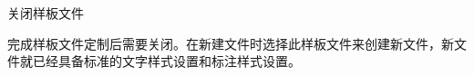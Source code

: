 \begin{procedure}
\begin{figure}[htbp]
\centering
\begin{floatrow}[2]
\end{floatrow}
\end{figure}

\item 关闭样板文件

完成样板文件定制后需要关闭。在新建文件时选择此样板文件来创建新文件，新文件就已经具备标准的文字样式设置和标注样式设置。
\end{procedure}
\endinput